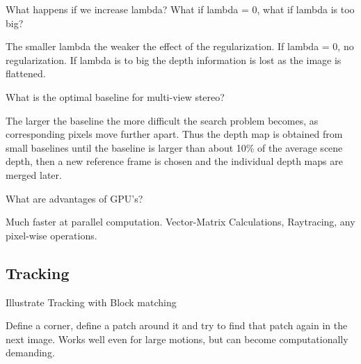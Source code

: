 \documentclass[10pt,a4paper]{scrartcl}
\begin{document}
\begin{multicols*}{2}
\begin{QandA}
{What happens if we increase lambda? What if lambda = 0, what if lambda is too big?}
\item The smaller lambda the weaker the effect of the regularization. If lambda = 0, no regularization. If lambda is to big the depth information is lost as the image is flattened.
\end{QandA}

\begin{QandA}
{What is the optimal baseline for multi-view stereo?}
\item The larger the baseline the more difficult the search problem becomes, as corresponding pixels move further apart. Thus the depth map is obtained from small baselines until the baseline is larger than about 10\% of the average scene depth, then a new reference frame is chosen and the individual depth maps are merged later.
\end{QandA}

\begin{QandA}
{What are advantages of GPU's?}
\item Much faster at parallel computation. Vector-Matrix Calculations, Raytracing, any pixel-wise operations.
\end{QandA}

\subsection*{Tracking}

\begin{QandA}
{Illustrate Tracking with Block matching}
\item Define a corner, define a patch around it and try to find that patch again in the next image. Works well even for large motions, but can become computationally demanding. 
\end{QandA}


\end{multicols*}
\end{document}
